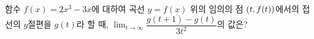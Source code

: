 함수 $f(x)=2x^3-3x$에 대하여 곡선 $y=f(x)$ 위의 임의의 점 $(t{,}\mkern3mu\mathopen{}f(t))$에서의 접선의 $y$절편을 $g(t)$라 할 때, $\displaystyle\lim_{t\to\infty}\dfrac{g(t+1)-g(t)}{3t^2}$의 값은?
